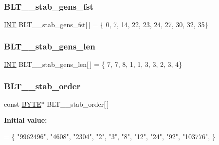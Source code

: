 \subsubsection{\texorpdfstring{B\+L\+T\+\_\+\_\+stab\+\_\+gens\+\_\+fst}{BLT\_47\_stab\_gens\_fst}}
{\footnotesize\ttfamily \mbox{\hyperlink{galois_8h_a09fddde158a3a20bd2dcadb609de11dc}{I\+NT}} B\+L\+T\+\_\+\_\+stab\+\_\+gens\+\_\+fst\mbox{[}$\,$\mbox{]} = \{ 0, 7, 14, 22, 23, 24, 27, 30, 32, 35\}}

\mbox{\label{data___b_l_t_8_c_ac6ca9bc2b70a8cc84880cbb0d400e8ae}} 
\subsubsection{\texorpdfstring{B\+L\+T\+\_\+\_\+stab\+\_\+gens\+\_\+len}{BLT\_47\_stab\_gens\_len}}
{\footnotesize\ttfamily \mbox{\hyperlink{galois_8h_a09fddde158a3a20bd2dcadb609de11dc}{I\+NT}} B\+L\+T\+\_\+\_\+stab\+\_\+gens\+\_\+len\mbox{[}$\,$\mbox{]} = \{ 7, 7, 8, 1, 1, 3, 3, 2, 3, 4\}}

\mbox{\label{data___b_l_t_8_c_a38bd8aa6a8739db607d25991a974ec32}} 
\subsubsection{\texorpdfstring{B\+L\+T\+\_\+\_\+stab\+\_\+order}{BLT\_47\_stab\_order}}
{\footnotesize\ttfamily const \mbox{\hyperlink{galois_8h_ab6cc7b4aeb6ea31aba2b3fbfc83ff5e6}{B\+Y\+TE}}$\ast$ B\+L\+T\+\_\+\_\+stab\+\_\+order\mbox{[}$\,$\mbox{]}}

{\bfseries Initial value\+:}
\begin{DoxyCode}
= \{
\textcolor{stringliteral}{"9962496"},
\textcolor{stringliteral}{"4608"},
\textcolor{stringliteral}{"2304"},
\textcolor{stringliteral}{"2"},
\textcolor{stringliteral}{"3"},
\textcolor{stringliteral}{"8"},
\textcolor{stringliteral}{"12"},
\textcolor{stringliteral}{"24"},
\textcolor{stringliteral}{"92"},
\textcolor{stringliteral}{"103776"},
\}
\end{DoxyCode}
\mbox{\label{data___b_l_t_8_c_a0052b5f550337059f61fc0f9d9fbb9f1}} 

